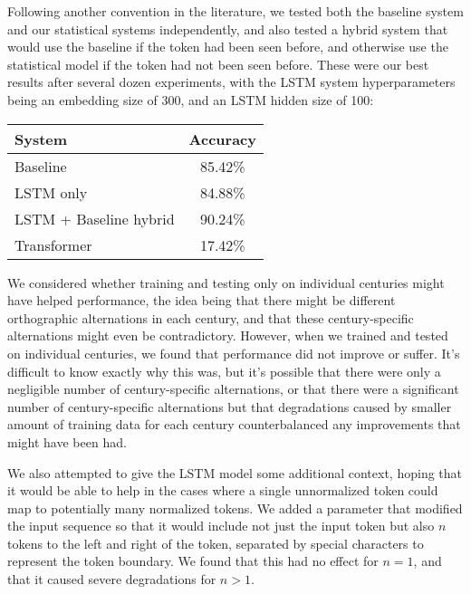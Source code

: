\documentclass[11pt,a4paper]{article}
\begin{document}
Following another convention in the literature, we tested both the baseline system and our statistical systems independently, and also tested a hybrid system that would use the baseline if the token had been seen before, and otherwise use the statistical model if the token had not been seen before. These were our best results after several dozen experiments, with the LSTM system hyperparameters being an embedding size of 300, and an LSTM hidden size of 100:

\begin{center}
\begin{tabular}{|l|c|}\hline
System & Accuracy \\\hline
Baseline & 85.42\% \\\hline
LSTM only & 84.88\% \\\hline
LSTM + Baseline hybrid & 90.24\% \\\hline
Transformer & 17.42\% \\\hline
\end{tabular}
\end{center}

We considered whether training and testing only on individual centuries might have helped performance, the idea being that there might be different orthographic alternations in each century, and that these century-specific alternations might even be contradictory. However, when we trained and tested on individual centuries, we found that performance did not improve or suffer. It’s difficult to know exactly why this was, but it’s possible that there were only a negligible number of century-specific alternations, or that there were a significant number of century-specific alternations but that degradations caused by smaller amount of training data for each century counterbalanced any improvements that might have been had.

We also attempted to give the LSTM model some additional context, hoping that it would be able to help in the cases where a single unnormalized token could map to potentially many normalized tokens. We added a parameter that modified the input sequence so that it would include not just the input token but also $n$ tokens to the left and right of the token, separated by special characters to represent the token boundary. We found that this had no effect for $n=1$, and that it caused severe degradations for $n>1$. 
\end{document}
